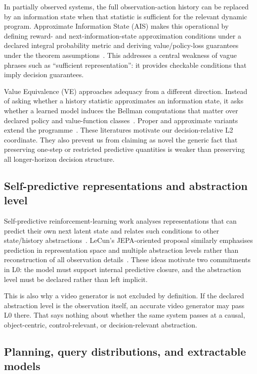 \documentclass[10pt]{article}
\begin{document}
In partially observed systems, the full observation-action history can be replaced by an information state when that statistic is sufficient for the relevant dynamic program. Approximate Information State (AIS) makes this operational by defining reward- and next-information-state approximation conditions under a declared integral probability metric and deriving value/policy-loss guarantees under the theorem assumptions~\cite{subramanian2022}. This addresses a central weakness of vague phrases such as ``sufficient representation'': it provides checkable conditions that imply decision guarantees.

Value Equivalence (VE) approaches adequacy from a different direction. Instead of asking whether a history statistic approximates an information state, it asks whether a learned model induces the Bellman computations that matter over declared policy and value-function classes~\cite{grimm2020}. Proper and approximate variants extend the programme~\cite{grimm2021,grimm2022}. These literatures motivate our decision-relative L2 coordinate. They also prevent us from claiming as novel the generic fact that preserving one-step or restricted predictive quantities is weaker than preserving all longer-horizon decision structure.

\subsection{Self-predictive representations and abstraction level}

Self-predictive reinforcement-learning work analyses representations that can predict their own next latent state and relates such conditions to other state/history abstractions~\cite{ni2024}. LeCun's JEPA-oriented proposal similarly emphasises prediction in representation space and multiple abstraction levels rather than reconstruction of all observation details~\cite{lecun2022}. These ideas motivate two commitments in L0: the model must support internal predictive closure, and the abstraction level must be declared rather than left implicit.

This is also why a video generator is not excluded by definition. If the declared abstraction level is the observation itself, an accurate video generator may pass L0 there. That says nothing about whether the same system passes at a causal, object-centric, control-relevant, or decision-relevant abstraction.

\subsection{Planning, query distributions, and extractable models}
\end{document}
